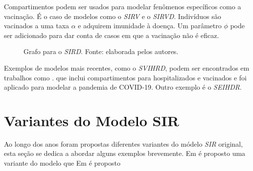 Compartimentos podem ser usados para modelar fenômenos específicos como a vacinação.
É o caso de modelos como o \textit{SIRV} \cite{schlickeiser-kroger:21-sirv} 
e o \textit{SIRVD}. Indivíduos são vacinados a uma taxa $\alpha$ e adquirem imunidade
à doença. Um parâmetro $\phi$ pode ser adicionado para dar conta de casos em que
a vacinação não é eficaz. 

\begin{figure}
\centering
{}
\caption{Grafo para o \textit{SIRD}. Fonte: elaborada pelos autores.}
\label{fig:sirv-grafo}
\end{figure}

Exemplos de modelos mais recentes, como o \textit{SVIHRD}, podem ser encontrados
em trabalhos como \cite{nelson-etal:24-japao}.
que inclui compartimentos para hospitalizados e vacinados e foi aplicado para 
modelar a pandemia de COVID-19. Outro exemplo é o \textit{SEIHDR}. 

\section{Variantes do Modelo SIR}

Ao longo dos anos foram propostas diferentes variantes do módelo \textit{SIR} original,
esta seção se dedica a abordar alguns exemplos brevemente. 
Em \cite{noble:1974-sir-difusao} é proposto uma variante do modelo que 
Em \cite{singh-gupta:2022-generalized-sir} é proposto     

